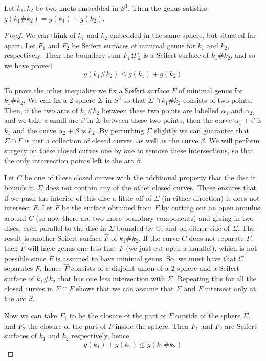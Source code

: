 \begin{lem}
\label{additivity of genus}
Let $k_1,k_2$ be two knots embedded in $S^3$. Then the genus satisfies $g(k_1 \# k_2) = g(k_1) + g(k_2)$.
\end{lem}
\begin{proof}
We can think of $k_1$ and $k_2$ embedded in the same sphere, but situated far apart. Let $F_1$ and $F_2$ be Seifert surfaces of minimal genus for $k_1$ and $k_2$, respectively. Then the boundary sum $F_1 \sharp F_2$ is a Seifert surface of $k_1 \# k_2$, and so we have proved
\[ g(k_1 \# k_2) \leq g(k_1) + g(k_2) \]

To prove the other inequality we fix a Seifert surface $F$ of minimal genus for $k_1 \# k_2$. We can fix a 2-sphere $\Sigma$ in $S^3$ so that $\Sigma \cap k_1 \# k_2$ consists of two points. Then, if the two arcs of $k_1 \# k_2$ between these two points are labelled $\alpha_1$ and $\alpha_2$, and we take a small arc $\beta$ in $\Sigma$ between these two points, then the curve $\alpha_1 + \beta$ is $k_1$ and the curve $\alpha_2 + \beta$ is $k_2$. By perturbing $\Sigma$ slightly we can guarantee that $\Sigma \cap F$ is just a collection of closed curves, as well as the curve $\beta$. We will perform surgery on these closed curves one by one to remove these intersections, so that the only intersection points left is the arc $\beta$.

Let $C$ be one of these closed curves with the additional property that the disc it bounds in $\Sigma$ does not contain any of the other closed curves. These ensures that if we push the interior of this disc a little off of $\Sigma$ (in either direction) it does not intersect $F$. Let $\hat F$ be the surface obtained from $F$ by cutting out an open annulus around $C$ (so now there are two more boundary components) and gluing in two discs, each parallel to the disc in $\Sigma$ bounded by $C$, and on either side of $\Sigma$. The result is another Seifert surface $\hat F$ of $k_1 \# k_2$. If the curve $C$ does not separate $F$, then $\hat F$ will have genus one less that $F$ (we just cut open a handle!), which is not possible since $F$ is assumed to have minimal genus. So, we must have that $C$ separates $F$, hence $\hat F$ consists of a disjoint union of a 2-sphere and a Seifert surface of $k_1 \# k_2$ that has one less intersection with $\Sigma$. Repeating this for all the closed curves in $\Sigma \cap F$ shows that we can assume that $\Sigma$ and $F$ intersect only at the arc $\beta$. 

Now we can take $F_1$ to be the closure of the part of $F$ outside of the sphere $\Sigma$, and $F_2$ the closure of the part of $F$ inside the sphere. Then $F_1$ and $F_2$ are Seifert surfaces of $k_1$ and $k_2$ respectively, hence
\[ g(k_1) + g(k_2) \leq g(k_1 \# k_2) \]
\end{proof}


